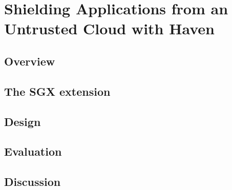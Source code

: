 \section{Shielding Applications from an Untrusted Cloud with Haven}

\subsection{Overview}

\subsection{The SGX extension}

\subsection{Design}

\subsection{Evaluation}

\subsection{Discussion}
